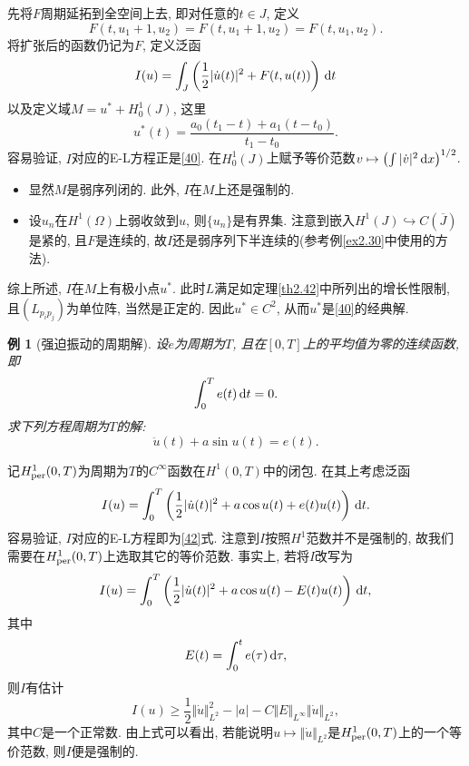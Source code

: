 \documentclass[12pt,a4paper]{article}
\newtheorem{example}[theorem]{例}
\begin{document}
先将$F$周期延拓到全空间上去, 即对任意的$t \in J$, 定义 
\begin{equation*}
    F(t, u_1 + 1, u_2) = F(t, u_1 + 1, u_2) = F(t, u_1, u_2).
\end{equation*}
将扩张后的函数仍记为$F$, 定义泛函 
\begin{equation*}
    I(u) = \int_J\left(\frac{1}{2}|\dot u(t)|^2 + F(t, u(t))\right) \,{\rm d}t
\end{equation*}
以及定义域$M = u^* + H_0^1(J)$, 这里 
\begin{equation*}
    u^*(t) = \frac{a_0(t_1 - t) + a_1(t - t_0)}{t_1 - t_0}.
\end{equation*}
容易验证, $I$对应的E-L方程正是\eqref{40}. 在$H_0^1(J)$上赋予等价范数$v \mapsto \left(\int|\dot v|^2 \,{\rm d}x\right)^{1/2}$.
\begin{itemize}
    \item 显然$M$是弱序列闭的. 此外, $I$在$M$上还是强制的.
    \item 设$u_n$在$H^1(\Omega)$上弱收敛到$u$, 则$\{u_n\}$是有界集.
    注意到嵌入$H^1(J) \hookrightarrow C(\overline{J})$是紧的, 且$F$是连续的, 故$I$还是弱序列下半连续的(参考例\ref{ex2.30}中使用的方法). 
\end{itemize}
综上所述, $I$在$M$上有极小点$u^*$. 此时$L$满足如定理\ref{th2.42}中所列出的增长性限制, 且$(L_{p_ip_j})$为单位阵, 当然是正定的.
因此$u^* \in C^2$, 从而$u^*$是\eqref{40}的经典解.

\begin{example}[强迫振动的周期解]
    设$e$为周期为$T$, 且在$[0, T]$上的平均值为零的连续函数, 即 
    \begin{equation}\label{41}
        \int_0^Te(t) \,{\rm d}t = 0.
    \end{equation}
    求下列方程周期为$T$的解:
    \begin{equation*}
        \ddot u(t) + a\sin u(t) = e(t).
    \end{equation*}
\end{example}

记$H_{{\rm per}}^1(0, T)$为周期为$T$的$C^{\infty}$函数在$H^1(0, T)$中的闭包.
在其上考虑泛函 
\begin{equation*}
    I(u) = \int_0^T\left(\frac{1}{2}|\dot u(t)|^2 + a\cos u(t) + e(t)u(t)\right) \,{\rm d}t.
\end{equation*}
容易验证, $I$对应的E-L方程即为\eqref{42}式. 注意到$I$按照$H^1$范数并不是强制的, 故我们需要在$H_{{\rm per}}^1(0, T)$上选取其它的等价范数.
事实上, 若将$I$改写为
\begin{equation*}
    I(u) = \int_0^T\left(\frac{1}{2}|\dot u(t)|^2 + a\cos u(t) - E(t)u(t)\right) \,{\rm d}t,
\end{equation*}
其中 
\begin{equation*}
    E(t) = \int_0^te(\tau) \,{\rm d}\tau,
\end{equation*}
则$I$有估计 
\begin{equation*}
    I(u) \geq \frac{1}{2}\Vert \dot u \Vert_{L^2}^2 - |a| - C\Vert E \Vert_{L^{\infty}}\Vert \dot u \Vert_{L^2},
\end{equation*}
其中$C$是一个正常数. 由上式可以看出, 若能说明$u \mapsto \Vert \dot u \Vert_{L^2}$是$H_{{\rm per}}^1(0, T)$上的一个等价范数, 则$I$便是强制的.
\end{document}
